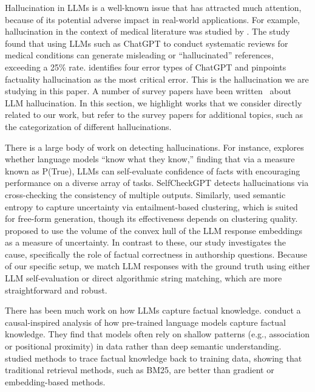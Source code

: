 \documentclass[11pt]{article}
\begin{document}
Hallucination in LLMs is a well-known issue that has attracted much attention, because of its potential adverse impact in real-world applications. For example, hallucination in the context of medical literature was studied by \citet{Chelli2024}. The study found that using LLMs such as ChatGPT to conduct systematic reviews for medical conditions can generate misleading or “hallucinated” references, exceeding a 25\% rate. \citet{zheng2023doeschatgptfallshort} identifies four error types of ChatGPT and pinpoints factuality hallucination as the most critical error. This is the hallucination we are studying in this paper. A number of survey papers have been written~\citep{Huang_2025_hallucination_survey, zhang2025sirenssongaiocean} about LLM hallucination. In this section, we highlight works that we consider directly related to our work, but refer to the survey papers for additional topics, such as the categorization of different hallucinations.

There is a large body of work on detecting hallucinations. For instance, \citet{Kadavath2022} explores whether language models ``know what they know,'' finding that via a measure known as P(True), LLMs can self-evaluate confidence of facts with encouraging performance on a diverse array of tasks. SelfCheckGPT \citep{Manakul2023} detects hallucinations via cross-checking the consistency of multiple outputs.
Similarly, \citet{farquhar2024} used semantic entropy to capture uncertainty via entailment-based clustering, which is suited for free-form generation, though its effectiveness depends on clustering quality.
\citet{phillips2025geometricuncertaintydetectingcorrecting} proposed to use the volume of the convex hull of the LLM response embeddings as a measure of uncertainty.
In contrast to these, our study investigates the cause, specifically the role of factual correctness in authorship questions. Because of our specific setup, we match LLM responses with the ground truth using either LLM self-evaluation or direct algorithmic string matching, which are more straightforward and robust.

There has been much work on how LLMs capture factual knowledge. \citet{li2022} conduct a causal-inspired analysis of how pre-trained language models capture factual knowledge. They find that models often rely on shallow patterns (e.g., association or positional proximity) in data rather than deep semantic understanding. \citet{akyurek2022} studied methods to trace factual knowledge back to training data, showing that traditional retrieval methods, such as BM25, are better than gradient or embedding-based methods.
\end{document}
